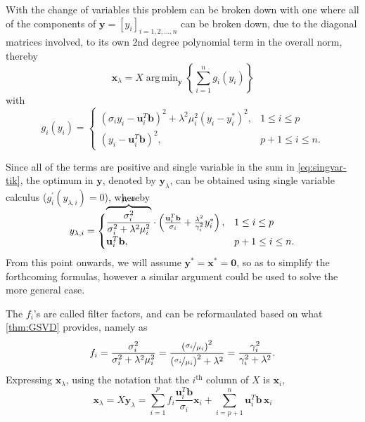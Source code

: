 \documentclass{article}
\newcommand{\mbf}[1]{\mathbf{#1}}
\DeclareMathOperator*{\argmin}{arg\,min} %
\begin{document}
	With the change of variables this problem can be broken down with one where all of the components of $\textbf{y} = \left[y_i\right]_{i=1,2,\dots,n}$ can be broken down, due to the diagonal matrices involved, to its own 2nd degree polynomial term in the overall norm, thereby
	\begin{equation}\label{eq:singvar-tik}
		\textbf{x}_{\lambda} = X \argmin_{\mbf{y}} \left\lbrace \sum_{i=1}^{n} g_i (y_i) \right\rbrace 
	\end{equation}
	with 
	\begin{equation}
		g_i (y_i) = \begin{cases}
			\left(\sigma_i y_i - \textbf{u}_i^T \textbf{b} \right)^2 + \lambda^2 \mu^2_i \left(y_i-y_i^\ast\right)^2, & 1 \leq i \leq p\\
			\left(y_i-\textbf{u}_i^T \textbf{b} \right)^2, & p+1 \leq i \leq n.
		\end{cases}
	\end{equation}
	
	Since all of the terms are positive and single variable in the sum in \autoref{eq:singvar-tik}, the optimum in $\textbf{y}$, denoted by ${\textbf{y}}_\lambda$, can be obtained using single variable calculus ($g_i^\prime({y}_{\lambda, i}) = 0$), whereby
	\vspace{0.2cm}
	\begin{equation}
		{y}_{\lambda,i} = \begin{cases}
			{\smash[t]{\overbrace{\frac{\sigma_i^2}{\sigma_i^2 + \lambda^2 \mu_i^2}}^{f_i := }}}
			\cdot \left(\frac{\textbf{u}_i^T \textbf{b}}{{\normalsize\sigma_i}} + \frac{\lambda^2}{\gamma_i^2}y_i^\ast \right), & 1 \leq i \leq p\\
			\textbf{u}_i^T \textbf{b}, & p+1 \leq i \leq n.
		\end{cases}
	\end{equation}
	From this point onwards, we will assume $\textbf{y}^\ast=\textbf{x}^\ast=\textbf{0}$, so as to simplify the forthcoming formulas, however a similar argument could be used to solve the more general case. 
	
	The $f_i$'s are called filter factors, and can be reformaulated based on what \autoref{thm:GSVD} provides, namely as
	\begin{equation}
		f_i = \frac{\sigma_i^2}{\sigma_i^2 + \lambda^2 \mu_i^2} = \frac{\left(\nicefrac{\sigma_i}{\mu_i}\right)^2}{\left(\nicefrac{\sigma_i}{\mu_i}\right)^2 + \lambda^2}
		= \frac{\gamma_i^2}{\gamma_i^2 + \lambda^2}.
	\end{equation} 
	Expressing $\textbf{x}_\lambda$, using the notation that the $i^{\mathrm{th}}$ column of $X$ is $\textbf{x}_i$, 
	\begin{equation}
		\mbf{x}_{\lambda} = X \textbf{y}_\lambda=\sum_{i=1}^pf_i\frac{\mbf{u}_i^T\mbf{b}}{\sigma_i}\mathbf{x}_i+
		\sum_{i=p+1}^n\mbf{u}_i^T\mbf{b}\,\mathbf{x}_i
	\end{equation}
		
\end{document}
